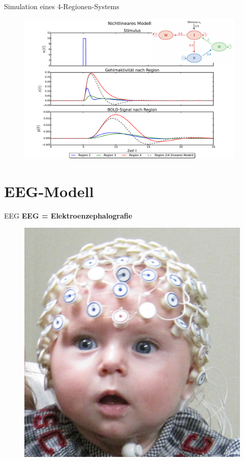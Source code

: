 \documentclass{beamer}
\begin{document}
\begin{frame}{Simulation eines 4-Regionen-Systems}
	\begin{figure}
		\vspace*{-0.33cm}
		\centering
		\includegraphics[width=0.975\textwidth]{res/hemodynamicExample2.pdf}
	\end{figure}
\end{frame}

\section{EEG-Modell}
\begin{frame}{EEG}
\textbf{EEG = Elektroenzephalografie}
\begin{figure}
\centering
\includegraphics[scale=0.3]{res/EEGbaby.png}
\end{figure}
\end{frame}
\end{document}
